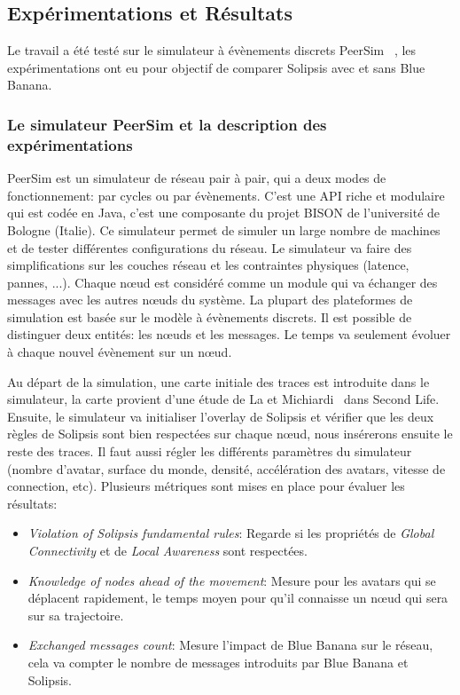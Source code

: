 	\subsection{Expérimentations et Résultats}
		Le travail a été testé sur le simulateur à évènements discrets PeerSim ~\cite{peersim}, les expérimentations ont eu pour objectif de comparer Solipsis avec et sans Blue Banana.
		\subsubsection{Le simulateur PeerSim et la description des expérimentations}
		\par PeerSim est un simulateur de réseau pair à pair, qui a deux modes de fonctionnement: par cycles ou par évènements. C'est une API riche et modulaire qui est codée en Java, c'est une composante du projet BISON de l'université de Bologne (Italie). Ce simulateur permet de simuler un large nombre de machines et de tester différentes configurations du réseau. Le simulateur va faire des simplifications sur les couches réseau et les contraintes physiques (latence, pannes, ...). Chaque nœud est considéré comme un module qui va échanger des messages avec les autres nœuds du système. La plupart des plateformes de simulation est basée sur le modèle à évènements discrets. Il est possible de distinguer deux entités: les nœuds et les messages. Le temps va seulement évoluer à chaque nouvel évènement sur un nœud.
		\par Au départ de la simulation, une carte initiale des traces est introduite dans le simulateur, la carte provient d'une étude de La et Michiardi~\cite{LM-wosn08} dans Second Life. Ensuite, le simulateur va initialiser l'overlay de Solipsis et vérifier que les deux règles de Solipsis sont bien respectées sur chaque nœud, nous insérerons ensuite le reste des traces. Il faut aussi régler les différents paramètres du simulateur (nombre d'avatar, surface du monde, densité, accélération des avatars, vitesse de connection, etc). Plusieurs métriques sont mises en place pour évaluer les résultats:
	\begin{itemize}
	\renewcommand{\labelitemi}{$\bullet$}
		\item \textit{Violation of Solipsis fundamental rules}: Regarde si les propriétés de \textit{Global Connectivity} et de \textit{Local Awareness} sont respectées.
		\item \textit{Knowledge of nodes ahead of the movement}: Mesure pour les avatars qui se déplacent rapidement, le temps moyen pour qu'il connaisse un nœud qui sera sur sa trajectoire.
		\item \textit{Exchanged messages count}: Mesure l'impact de Blue Banana sur le réseau, cela va compter le nombre de messages introduits par Blue Banana et Solipsis.
	\end{itemize}
